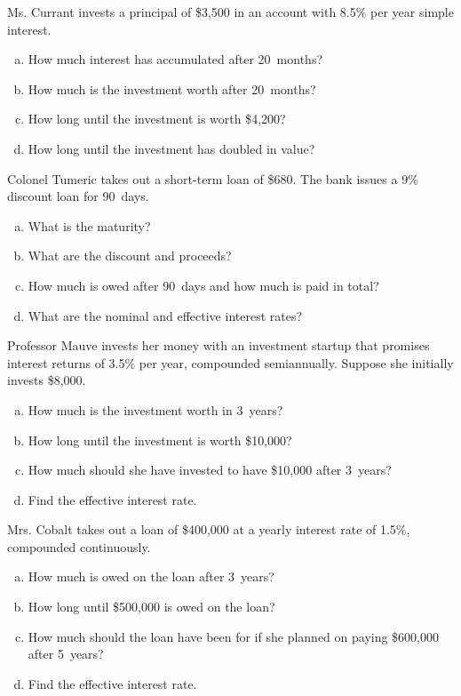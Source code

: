 \documentclass[11pt,letterpaper]{article}
\begin{document}

 Ms. Currant invests a principal of \$3,500 in an account with 8.5\% per year simple interest.
	\begin{enumerate}[(a)]
	\item How much interest has accumulated after 20~months?
	\item How much is the investment worth after 20~months?
	\item How long until the investment is worth \$4,200?
	\item How long until the investment has doubled in value?
	\end{enumerate}



\newpage



 Colonel Tumeric takes out a short-term loan of \$680. The bank issues a 9\% discount loan for 90~days.
	\begin{enumerate}[(a)]
	\item What is the maturity?
	\item What are the discount and proceeds?
	\item How much is owed after 90~days and how much is paid in total?
	\item What are the nominal and effective interest rates?
	\end{enumerate}



\newpage



 Professor Mauve invests her money with an investment startup that promises interest returns of 3.5\% per year, compounded semiannually. Suppose she initially invests \$8,000.  
	\begin{enumerate}[(a)]
	\item How much is the investment worth in 3~years?
	\item How long until the investment is worth \$10,000?
	\item How much should she have invested to have \$10,000 after 3~years?
	\item Find the effective interest rate.
	\end{enumerate}



\newpage



 Mrs. Cobalt takes out a loan of \$400,000 at a yearly interest rate of 1.5\%, compounded continuously. 
	\begin{enumerate}[(a)]
	\item How much is owed on the loan after 3~years?
	\item How long until \$500,000 is owed on the loan?
	\item How much should the loan have been for if she planned on paying \$600,000 after 5~years?
	\item Find the effective interest rate.
	\end{enumerate}
\end{document}

